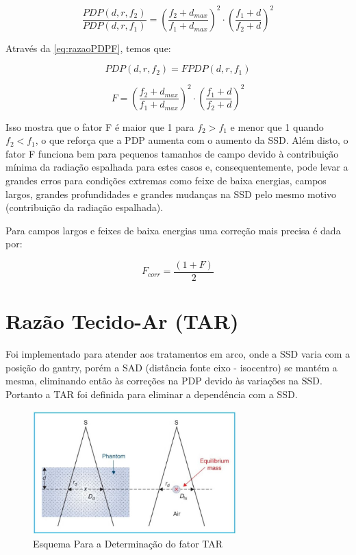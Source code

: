 \documentclass[11pt,a4paper]{article}
\newcounter{exemplo}
\begin{document}
	\begin{equation}
		\frac{PDP(d, r, f_2)}{PDP(d, r, f_1)} = \left(\frac{f_2 + d_{max}}{f_1 + d_{max}}\right)^2 \cdot \left(\frac{f_1 + d}{f_2 + d}\right)^2
		\label{eq:razaoPDPF}
	\end{equation}

	Através da \ref{eq:razaoPDPF}, temos que:

		$$PDP(d, r, f_2) = F PDP(d, r, f_1)$$

	\begin{exemplo}
		\begin{equation}
			F = \left(\frac{f_2 + d_{max}}{f_1 + d_{max}}\right)^2 \cdot \left(\frac{f_1 + d}{f_2 + d}\right)^2
			\label{eq:fatorF}
		\end{equation}
	\end{exemplo}


	Isso mostra que o fator F é maior que 1 para $f_2 > f_1$ e menor que 1 quando $f_2 < f_1$, o que reforça que a PDP aumenta com o aumento da SSD. Além disto, o fator F funciona bem para pequenos tamanhos de campo devido à contribuição mínima da radiação espalhada para estes casos e, consequentemente, pode levar a grandes erros para condições extremas como feixe de baixa energias, campos largos, grandes profundidades e grandes mudanças na SSD pelo mesmo motivo (contribuição da radiação espalhada). 

	Para campos largos e feixes de baixa energias uma correção mais precisa é dada por:

		\begin{equation}
			F_{corr} = \frac{(1 + F)}{2}
		\end{equation}

	\section{Razão Tecido-Ar (TAR)}

	Foi implementado para atender aos tratamentos em arco, onde a SSD varia com a posição do gantry, porém a SAD (distância fonte eixo - isocentro) se mantém a mesma, eliminando então às correções na PDP devido às variações na SSD. Portanto a TAR foi definida para eliminar a dependência com a SSD. 

	\begin{figure}[h]
		\centering
		\includegraphics[width=0.7\textwidth]{Imagens/esquemaTAR.JPG}
		\caption{Esquema Para a Determinação do fator TAR}
		\label{fig:esquemaTAR}
	\end{figure}
\end{document}
